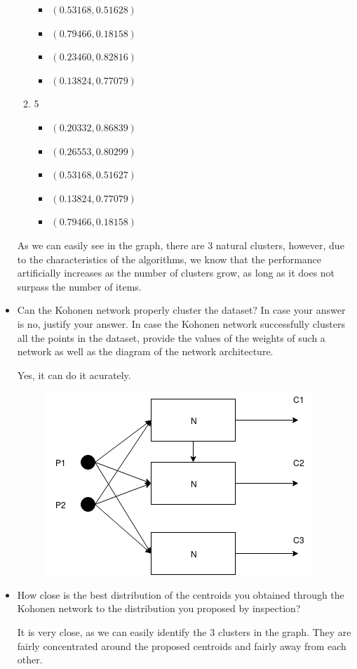 \documentclass{article}
\begin{document}
\begin{itemize}
\begin{enumerate}
\begin{itemize}
            \item $(0.53168, 0.51628)$
            \item $(0.79466, 0.18158)$
            \item $(0.23460, 0.82816)$
            \item $(0.13824, 0.77079)$
        \end{itemize}
        \item 5
        \begin{itemize}
            \item $(0.20332, 0.86839)$
            \item $(0.26553, 0.80299)$
            \item $(0.53168, 0.51627)$
            \item $(0.13824, 0.77079)$
            \item $(0.79466, 0.18158)$
        \end{itemize}
    \end{enumerate}

    As we can easily see in the graph, there are 3 natural clusters, however, due to the characteristics of the algorithms, we know that the performance artificially increases as the number of clusters grow, as long as it does not surpass the number of items.

    \item Can the Kohonen network properly cluster the dataset? In case your answer is no, justify your answer. In case the Kohonen network successfully clusters all the points in the dataset, provide the values of the weights of such a network as well as the diagram of the network architecture.
    
    Yes, it can do it acurately.
    \begin{figure}[ht]
        \includegraphics[]{NN.png}        
    \end{figure}
    
    \item How close is the best distribution of the centroids you obtained through the Kohonen network to the distribution you proposed by inspection?
    
    It is very close, as we can easily identify the 3 clusters in the graph. They are fairly concentrated around the proposed centroids and fairly away from each other.

\end{itemize}
\end{document}
